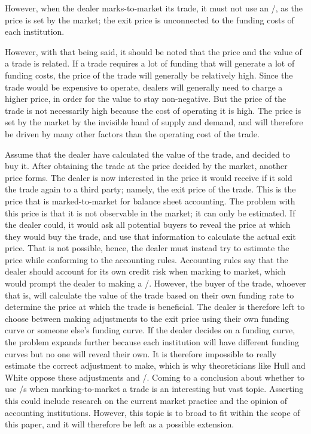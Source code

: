 \documentclass[main.tex]{subfiles}
\begin{document}
    However, when the dealer marks-to-market its trade, it must not use an \FVA/, 
    as the price is set by the market;
    the exit price is unconnected to the funding costs of each institution.

    However, with that being said, 
    it should be noted that the price and the value of a trade is related.
    If a trade requires a lot of funding that will generate a lot of funding costs,
    the price of the trade will generally be relatively high.
    Since the trade would be expensive to operate, 
    dealers will generally need to charge a higher price, 
    in order for the value to stay non-negative.
    But the price of the trade is not necessarily high because the cost of operating it is high.
    The price is set by the market by the invisible hand of supply and demand,
    and will therefore be driven by many other factors than the operating cost of the trade.

    Assume that the dealer have calculated the value of the trade, and decided to buy it.
    After obtaining the trade at the price decided by the market, another price forms. 
    The dealer is now interested in the price it would receive 
    if it sold the trade again to a third party; namely, the exit price of the trade.
    This is the price that is marked-to-market for balance sheet accounting.
    The problem with this price is that it is not observable in the market; it can only be estimated.
    If the dealer could, it would ask all potential buyers to reveal the price 
    at which they would buy the trade, and use that information to calculate the actual exit price.
    That is not possible, hence, the dealer must instead try to estimate the price
    while conforming to the accounting rules.
    Accounting rules say that the dealer should account for its own credit risk 
    when marking to market, which would prompt the dealer to making a \DVA/.
    However, the buyer of the trade, whoever that is, will calculate the value of the trade
    based on their own funding rate to determine the price at which the trade is beneficial.
    The dealer is therefore left to choose between making adjustments to the exit price
    using their own funding curve or someone else's funding curve.
    If the dealer decides on a funding curve, the problem expands further
    because each institution will have different funding curves but no one will reveal their own.
    It is therefore impossible to really estimate the correct adjustment to make,
    which is why theoreticians like Hull and White oppose these adjustments and \FVA/.
    Coming to a conclusion about whether to use \FVA/s when marking-to-market a trade
    is an interesting but vast topic.
    Asserting this could include research on the current market practice and
    the opinion of accounting institutions.
    However, this topic is to broad to fit within the scope of this paper,
    and it will therefore be left as a possible extension.
\end{document}
